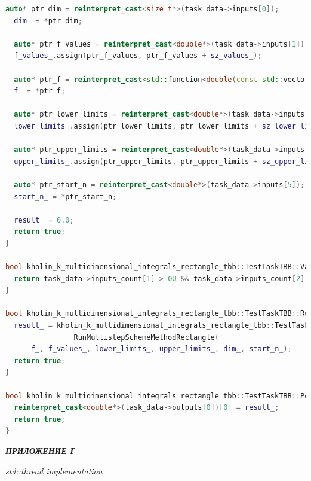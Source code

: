 \documentclass[14pt,a4paper]{article}
\begin{document}
\begin{framed}
\begin{lstlisting}[language=C++]
  auto* ptr_dim = reinterpret_cast<size_t*>(task_data->inputs[0]);
  dim_ = *ptr_dim;

  auto* ptr_f_values = reinterpret_cast<double*>(task_data->inputs[1]);
  f_values_.assign(ptr_f_values, ptr_f_values + sz_values_);

  auto* ptr_f = reinterpret_cast<std::function<double(const std::vector<double>&)>*>(task_data->inputs[2]);
  f_ = *ptr_f;

  auto* ptr_lower_limits = reinterpret_cast<double*>(task_data->inputs[3]);
  lower_limits_.assign(ptr_lower_limits, ptr_lower_limits + sz_lower_limits_);

  auto* ptr_upper_limits = reinterpret_cast<double*>(task_data->inputs[4]);
  upper_limits_.assign(ptr_upper_limits, ptr_upper_limits + sz_upper_limits_);

  auto* ptr_start_n = reinterpret_cast<double*>(task_data->inputs[5]);
  start_n_ = *ptr_start_n;

  result_ = 0.0;
  return true;
}

bool kholin_k_multidimensional_integrals_rectangle_tbb::TestTaskTBB::ValidationImpl() {
  return task_data->inputs_count[1] > 0U && task_data->inputs_count[2] > 0U;
}

bool kholin_k_multidimensional_integrals_rectangle_tbb::TestTaskTBB::RunImpl() {
  result_ = kholin_k_multidimensional_integrals_rectangle_tbb::TestTaskTBB::
                RunMultistepSchemeMethodRectangle(
      f_, f_values_, lower_limits_, upper_limits_, dim_, start_n_);
  return true;
}

bool kholin_k_multidimensional_integrals_rectangle_tbb::TestTaskTBB::PostProcessingImpl() {
  reinterpret_cast<double*>(task_data->outputs[0])[0] = result_;
  return true;
}

\end{lstlisting}
\end{framed}

\newpage

{\raggedright\textit{\large\bfseries ПРИЛОЖЕНИЕ Г}\par}

\textit{std::thread implementation}
\end{document}
